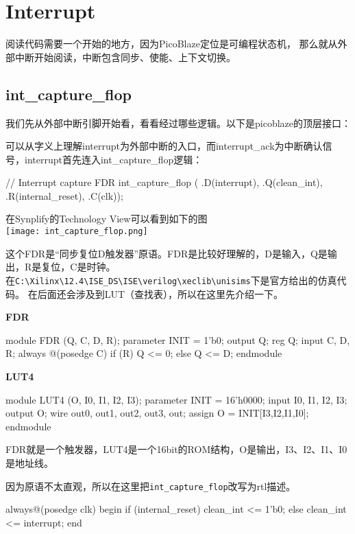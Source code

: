 \chapter{Interrupt}

阅读代码需要一个开始的地方，因为PicoBlaze定位是可编程状态机，
那么就从外部中断开始阅读，中断包含同步、使能、上下文切换。

\section{int\_capture\_flop}
我们先从外部中断引脚开始看，看看经过哪些逻辑。以下是picoblaze的顶层接口：



\newpage
可以从字义上理解interrupt为外部中断的入口，而interrupt\_ack为中断确认信号，interrupt首先连入int\_capture\_flop逻辑：

\begin{vcode}
// Interrupt capture
FDR int_capture_flop (
    .D(interrupt),
    .Q(clean_int),
    .R(internal_reset),
    .C(clk));
\end{vcode}

在Synplify的Technology View可以看到如下的图\\
\texttt{[image: int\_capture\_flop.png]}

这个FDR是“同步复位D触发器”原语。FDR是比较好理解的，D是输入，Q是输出，R是复位，C是时钟。\\
在\verb|C:\Xilinx\12.4\ISE_DS\ISE\verilog\xeclib\unisims|下是官方给出的仿真代码。
在后面还会涉及到LUT（查找表），所以在这里先介绍一下。

\textbf{FDR}
\begin{vcode}
module FDR (Q, C, D, R);
    parameter INIT = 1'b0;
    output Q;
    reg    Q;
    input  C, D, R;
    always @(posedge C)
        if (R)
        Q <= 0;
        else
        Q <= D;
endmodule
\end{vcode}

\textbf{LUT4}
\begin{vcode}
module LUT4 (O, I0, I1, I2, I3);
    parameter INIT = 16'h0000;
    input I0, I1, I2, I3;
    output O;
    wire out0, out1, out2, out3, out;
    assign O = INIT[{I3,I2,I1,I0}];
endmodule
\end{vcode}

FDR就是一个触发器，LUT4是一个16bit的ROM结构，O是输出，I3、I2、I1、I0是地址线。

因为原语不太直观，所以在这里把\verb|int_capture_flop|改写为rtl描述。

\begin{vcode}
always@(posedge clk)
begin
    if (internal_reset)
        clean_int <= 1'b0;
    else
        clean_int <= interrupt;
end
\end{vcode}


